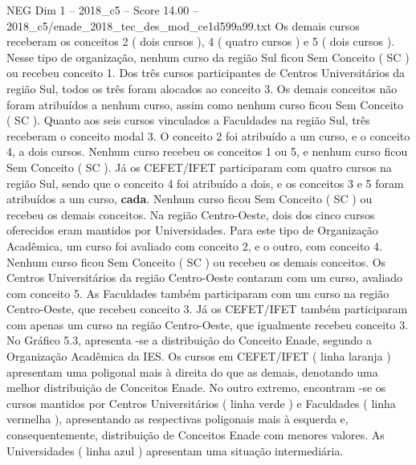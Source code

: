 \begin{textsample}{NEG Dim 1 – 2018\_c5 – Score 14.00 – 2018\_c5/enade\_2018\_tec\_des\_mod\_ce1d599a99.txt}
Os demais cursos receberam os conceitos 2 ( dois cursos ), 4 ( quatro cursos ) e 5 ( dois cursos ).
Nesse tipo de organização, nenhum curso da região Sul ficou Sem Conceito ( SC ) ou recebeu conceito 1.
Dos três cursos participantes de Centros Universitários da região Sul, todos os três foram alocados ao conceito 3.
Os demais conceitos não foram atribuídos a nenhum curso, assim como nenhum curso ficou Sem Conceito ( SC ).
Quanto aos seis cursos vinculados a Faculdades na região Sul, três receberam o conceito modal 3.
O conceito 2 foi atribuído a um curso, e o conceito 4, a dois cursos.
Nenhum curso recebeu os conceitos 1 ou 5, e nenhum curso ficou Sem Conceito ( SC ).
Já os CEFET/IFET participaram com quatro cursos na região Sul, sendo que o conceito 4 foi atribuído a dois, e os conceitos 3 e 5 foram atribuídos a um curso, \textbf{cada}.
Nenhum curso ficou Sem Conceito ( SC ) ou recebeu os demais conceitos.
Na região Centro-Oeste, dois dos cinco cursos oferecidos eram mantidos por Universidades.
Para este tipo de Organização Acadêmica, um curso foi avaliado com conceito 2, e o outro, com conceito 4.
Nenhum curso ficou Sem Conceito ( SC ) ou recebeu os demais conceitos.
Os Centros Universitários da região Centro-Oeste contaram com um curso, avaliado com conceito 5.
As Faculdades também participaram com um curso na região Centro-Oeste, que recebeu conceito 3.
Já os CEFET/IFET também participaram com apenas um curso na região Centro-Oeste, que igualmente recebeu conceito 3.
No Gráfico 5.3, apresenta -se a distribuição do Conceito Enade, segundo a Organização Acadêmica da IES.
Os cursos em CEFET/IFET ( linha laranja ) apresentam uma poligonal mais à direita do que as demais, denotando uma melhor distribuição de Conceitos Enade.
No outro extremo, encontram -se os cursos mantidos por Centros Universitários ( linha verde ) e Faculdades ( linha vermelha ), apresentando as respectivas poligonais mais à esquerda e, consequentemente, distribuição de Conceitos Enade com menores valores.
As Universidades ( linha azul ) apresentam uma situação intermediária.

\end{textsample}
